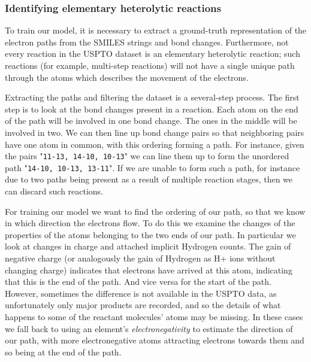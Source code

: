\subsubsection{Identifying elementary heterolytic reactions}

To train our model, it is necessary to extract a ground-truth representation of the electron paths from the SMILES strings and bond changes.
Furthermore, not every reaction in the USPTO dataset is an elementary heterolytic reaction; 
such reactions (for example, multi-step reactions) will not have a single unique path through the atoms 
which describes the movement of the electrons.

Extracting the paths and filtering the dataset is a several-step process.
The first step is to look at the bond changes present in a reaction. 
Each atom on the end of the path will be involved in one bond change. 
The ones in the middle will be involved in two. 
We can then line up bond change pairs so that neighboring pairs have one atom in common,
 with this ordering forming a path.
For instance, given the pairs "\texttt{11-13, 14-10, 10-13}" we can line them up to form the unordered path "\texttt{14-10, 10-13, 13-11}".
If we are unable to form such a path, for instance due to two paths being present as a result of multiple reaction stages, then we can discard such reactions.

For training our model we want to find the ordering of our path, so that we know in which direction the electrons flow.
To do this we examine the changes of the properties of the atoms belonging to the two ends of our path. 
In particular we look at changes in charge and attached implicit Hydrogen counts. 
The gain of negative charge (or analogously the gain of Hydrogen as H+ ions without changing charge) indicates that electrons have arrived at this atom, 
indicating that this is the end of the path. 
And vice versa for the start of the path.
However, sometimes the difference is not available in the USPTO data, as unfortunately only major products are recorded, and so the details of what happens to some of the reactant molecules' atoms may be missing.
In these cases we fall back to using an element's {\em electronegativity} to estimate the direction of our path, with more electronegative atoms attracting electrons towards them and so being at the end of the path. 

